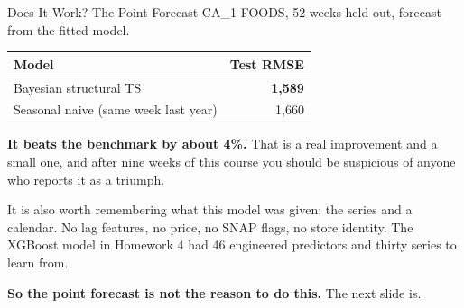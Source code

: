 \documentclass[aspectratio=169, 11pt]{beamer}
\begin{document}
\begin{frame}{Does It Work? The Point Forecast}
  CA\_1 FOODS, 52 weeks held out, forecast from the fitted model.
  \begin{center}
    {\small
    \begin{tabular}{lr}
      \toprule
      \textbf{Model} & \textbf{Test RMSE} \\
      \midrule
      Bayesian structural TS & \textbf{1{,}589} \\
      Seasonal naive (same week last year) & 1{,}660 \\
      \bottomrule
    \end{tabular}
    }
  \end{center}

  \vspace{-0.05cm}
  \textbf{It beats the benchmark by about 4\%.} That is a real improvement and a small one, and
  after nine weeks of this course you should be suspicious of anyone who reports it as a
  triumph.

  \vspace{0.15cm}
  It is also worth remembering what this model was given: the series and a calendar. No lag
  features, no price, no SNAP flags, no store identity. The XGBoost model in Homework 4 had 46
  engineered predictors and thirty series to learn from.

  \vspace{0.1cm}
  \textbf{So the point forecast is not the reason to do this.} The next slide is.
\end{frame}
\end{document}
